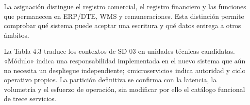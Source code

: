 \documentclass[11pt]{article}
\begin{document}
La asignación distingue el registro comercial, el registro financiero y las funciones que permanecen en ERP/DTE, WMS y remuneraciones. Esta distinción permite comprobar qué sistema puede aceptar una escritura y qué datos entrega a otros ámbitos.

La Tabla 4.3 traduce los contextos de SD-03 en unidades técnicas candidatas. «Módulo» indica una responsabilidad implementada en el nuevo sistema que aún no necesita un despliegue independiente; «microservicio» indica autoridad y ciclo operativo propios. La partición definitiva se confirma con la latencia, la volumetría y el esfuerzo de operación, sin modificar por ello el catálogo funcional de trece servicios.

\par\vspace{0pt plus 10\baselineskip}\vspace{0pt plus -10\baselineskip}
\end{document}
